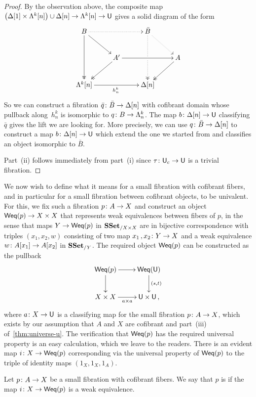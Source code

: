 \documentclass[reqno,10pt,a4paper,oneside,draft]{amsart}
\begin{document}
\begin{proof}
By the observation above, the composite map $\big( \Delta[1] \times \Lambda^k[n]  \big) \cup \Delta[n] \rightarrow \Lambda^k[n] \to \mathsf{U}$  gives a solid diagram of the form
\[ 
\xymatrix{
  B
  \ar@{.>}[rr]
  \ar[dr]
  \ar@{->>}[dd]
&&
  \bar{B}
  \ar@{.>}[dr]
  \ar@{.>>}[dd]|{\hole}
&\\&
  A'
  \ar[rr]
  \ar@{->>}[dl]
&&
  A
  \ar@{->>}[dl]
\\
  \Lambda^k[n]
  \ar[rr]_{h^k_n}
&&
  \Delta[n]
&
}
\] 
So we can construct a fibration  $\bar{q} \colon \bar{B} \to \Delta[n]$ with cofibrant domain whose pullback 
along~$h^k_n$ is isomorphic to $q \colon B \to \Lambda^k_n$. The map $b \colon \Delta[n] \rightarrow \mathsf{U}$ classifying $\bar{q}$ gives the lift we are looking for. More precisely, we can use $q  \colon \bar{B} \to
\Delta[n]$ to construct  a map $b \colon \Delta[n] \rightarrow \mathsf{U}$ which extend the one we started from and classifies 
an object isomorphic to $\bar{B}$.

Part~(ii) follows immediately from part~(i) since $\tau \colon \mathsf{U}_c \to \mathsf{U}$ is a trivial fibration.
\end{proof}




We now wish to define  what it means for a small fibration with cofibrant fibers, and in particular for a small fibration between cofibrant objects, to  be univalent. For this, we fix such a fibration $p \colon A \to X$ and construct an object $\mathsf{Weq}(p) \to X \times X$ that represents weak
equivalences between fibers of $p$, in the sense that maps $Y \to \mathsf{Weq}(p)$ in $\mathbf{SSet}_{/X \times X}$ are in bijective correspondence with triples $(x_1, x_2, w)$ consisting of two map $x_1 \, , x_2 \colon Y \to X$ and a weak equivalence $w \colon A[x_1]
\to A[x_2]$ in $\mathbf{SSet}_{/Y}$. The required object $\mathsf{Weq}(p)$ can be constructed as the pullback
\[
\xymatrix{
\Weq(p) \ar[r] \ar[d] & \Weq(\U) \ar[d]^{(s,t)} \\
X \times X \ar[r]_{a \times a} & \U \times \U \, ,}
\]
where $a \colon X \to \mathsf{U}$ is a classifying map for the small fibration $p \colon A \to X$, which exists by our assumption
that $A$ and $X$ are cofibrant and part~(iii) of~\cref{thm:universe-u}. The verification that $\mathsf{Weq}(p)$
has the required universal property is an easy calculation, which we leave to the readers. There is an
evident map $i \colon X \to \mathsf{Weq}(p)$ corresponding via the universal property of $\mathsf{Weq}(p)$ to the triple of identity maps $(1_X, 1_X, 1_A)$.




\begin{definition}  \label{equ:characterisations-of-univalence} Let $p \colon A \to X$ be a small fibration with cofibrant fibers. We say that $p$ is  if the map $i \colon X \to \mathsf{Weq}(p)$ is a weak equivalence. 
\end{definition}
\end{document}
